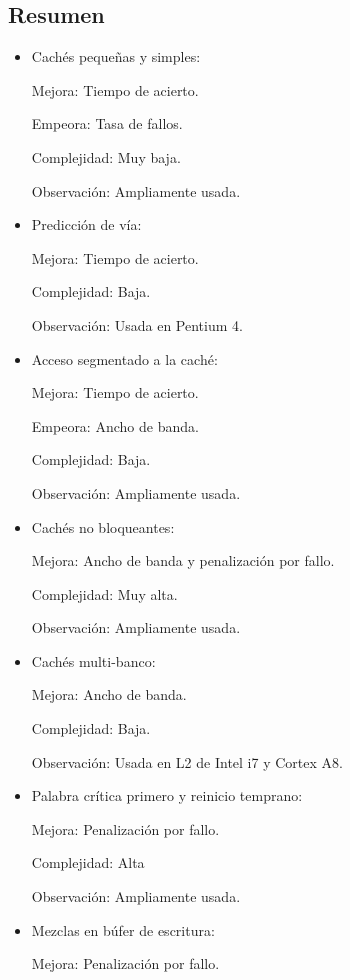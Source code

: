 \documentclass[12pt, twoside, openright]{report} %
\begin{document}
\subsection{Resumen}
\begin{itemize}
	\item Cachés pequeñas y simples:

	      Mejora: Tiempo de acierto.

	      Empeora: Tasa de fallos.

	      Complejidad: Muy baja.

	      Observación: Ampliamente usada.

	\item Predicción de vía:

	      Mejora: Tiempo de acierto.

	      Complejidad: Baja.

	      Observación: Usada en Pentium 4.

	\item Acceso segmentado a la caché:

	      Mejora: Tiempo de acierto.

	      Empeora: Ancho de banda.

	      Complejidad: Baja.

	      Observación: Ampliamente usada.

	\item Cachés no bloqueantes:

	      Mejora: Ancho de banda y penalización por fallo.

	      Complejidad: Muy alta.

	      Observación: Ampliamente usada.

	\item Cachés multi-banco:

	      Mejora: Ancho de banda.

	      Complejidad: Baja.

	      Observación: Usada en L2 de Intel i7 y Cortex A8.

	\item Palabra crítica primero y reinicio temprano:

	      Mejora: Penalización por fallo.

	      Complejidad: Alta

	      Observación: Ampliamente usada.

	\item Mezclas en búfer de escritura:

	      Mejora: Penalización por fallo.


\end{itemize}
\end{document}
